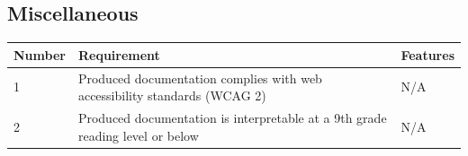 \documentclass{fank1basedocument}
\begin{document}
\subsection*{Miscellaneous}
\begin{center}
	\begin{tabular}{|p{}|p{}|p{}|}
		\hline
		\textbf{Number} & \textbf{Requirement} & \textbf{Features}\\
		\hline
		1 & Produced documentation complies with web accessibility standards (WCAG 2) & N/A\\
		\hline
		2 & Produced documentation is interpretable at a 9th grade reading level or below & N/A\\
		\hline
	\end{tabular}
\end{center}
\end{document}
